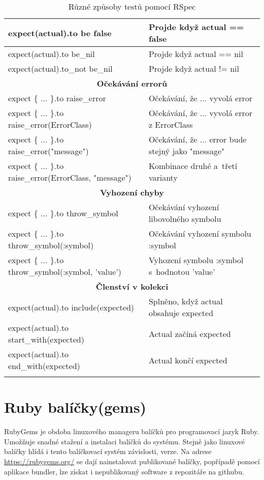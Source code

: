 \begin{center}
\begin{longtable}{| m{} | m{} |}
 \hline
 expect(actual).to be false   & Projde když actual == false \\
 \hline
 expect(actual).to be\_nil     & Projde když actual == nil \\
 \hline
 expect(actual).to\_not be\_nil & Projde když actual != nil \\
 \hline
 \multicolumn{2}{||c||}{\textbf{Očekávání errorů}}\\
 \hline
 expect \{ ... \}.to raise\_error & Očekávání, že ... vyvolá error \\
 \hline
 expect \{ ... \}.to raise\_error(ErrorClass) & Očekávání, že ... vyvolá error z ErrorClass\\
 \hline
 expect \{ ... \}.to raise\_error("message") & Očekávání, že ... error bude stejný jako "message" \\
 \hline
 expect \{ ... \}.to raise\_error(ErrorClass, "message")  & Kombinace druhé a~třetí varianty \\
 \hline
 \multicolumn{2}{||c||}{\textbf{Vyhození chyby}}\\
 \hline
 expect \{ ... \}.to throw\_symbol & Očekávání vyhození libovolného symbolu\\ 
 \hline
 expect \{ ... \}.to throw\_symbol(:symbol) & Očekávání vyhození symbolu :symbol\\ 
 \hline
 expect \{ ... \}.to throw\_symbol(:symbol, 'value') & Vyhození symbolu :symbol s~hodnotou 'value'\\ 
 \hline
 \multicolumn{2}{||c||}{\textbf{Členství v kolekci}}\\
 \hline
 expect(actual).to include(expected) & Splněno, když actual obsahuje expected \\
 \hline
 expect(actual).to start\_with(expected) & Actual začíná expected \\
 \hline
 expect(actual).to end\_with(expected) & Actual končí expected \\
 \hline
 \hline
 \caption[RSpec metody testování]{Různé způsoby testů pomocí RSpec}\label{tab:rspec}
\end{longtable}
\end{center}

\section{Ruby balíčky(gems)}
\par RubyGems\cite{elmendorfdirk2006} je obdoba linuxového manageru balíčků pro programovací jazyk Ruby. Umožňuje snadné stažení a instalaci balíčků do systému. Stejně jako linuxové balíčky hlídá i tento balíčkovací systém závislosti, verze. Na adrese \url{https://rubygems.org/} se dají nainstalovat publikované balíčky, popřípadě pomocí aplikace bundler, lze získat i nepublikovaný software z repozitáře na githubu. 